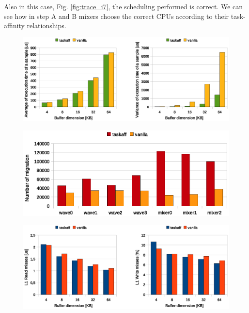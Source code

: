 Also in this case, Fig. \ref{fig:trace_i7}, the scheduling performed is correct. We can see how in step A and B mixers choose the correct CPUs according to
their task-affinity relationships.

\begin{figure}[htbp]
\centering
\includegraphics[width=\widefigure]{images/results_i7/time_avg_var_i7.eps}
\caption{}
\label{fig:time_avg_var_i7}
\end{figure}

\begin{figure}[htbp]
\centering
\includegraphics[width=\widefigure]{images/results_i7/migration_i7.eps}
\caption{}
\label{fig:migration_i7}
\end{figure}

\begin{figure}[htbp]
\centering
\includegraphics[width=\widefigure]{images/results_i7/l1_load_store_i7.eps}
\caption{}
\label{fig:l1_load_store_i7}
\end{figure}

